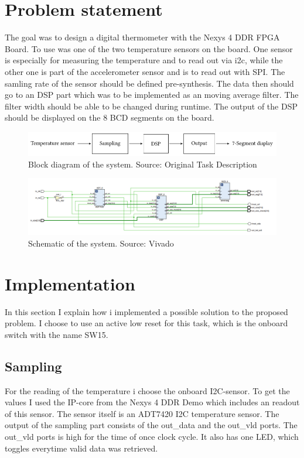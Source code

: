 \section{Problem statement}

The goal was to design a digital thermometer with the Nexys 4 DDR FPGA Board. To use was
one of the two temperature sensors on the board. One sensor is especially for measuring the 
temperature and to read out via i2c, while the other one is part of the accelerometer sensor
and is to read out with SPI. The samling rate of the sensor should be defined pre-synthesis.
The data then should go to an DSP part which was to be implemented as an moving average
filter. The filter width should be able to be changed during runtime. The output of the DSP should
be displayed on the 8 BCD segments on the board.

\begin{figure}[ht!]
	\centering
	\includegraphics[width=16cm]{fig/block}
	\caption{Block diagram of the system. Source: Original Task Description}
	\label{fig:block}
\end{figure}

\begin{figure}[ht!]
	\centering
	\includegraphics[width=16cm]{fig/schematic}
	\caption{Schematic of the system. Source: Vivado}
	\label{fig:block}
\end{figure}

\section {Implementation}
In this section I explain how i implemented a possible solution to the proposed problem. I choose
to use an active low reset for this task, which is the onboard switch with the name SW15.

\subsection{Sampling}
For the reading of the temperature i choose the onboard I2C-sensor. To get the values I
used the IP-core from the Nexys 4 DDR Demo which includes an readout of this sensor.
The sensor itself is an ADT7420 I2C temperature sensor. The output of the sampling part
consists of the out_data and the out_vld ports. The out_vld ports is high for the time of 
once clock cycle. It also has one LED, which toggles everytime valid data was retrieved.

